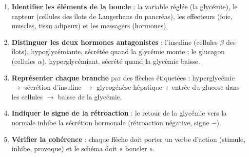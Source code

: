 \documentclass[11pt]{article}
\newcommand{\cle}[1]{{\popxbold\color{popdark}#1}}
\begin{document}
\begin{methode}
\begin{enumerate}
\item \textbf{Identifier les éléments de la boucle} : la variable réglée (la glycémie), le capteur (cellules des îlots de Langerhans du pancréas), les effecteurs (foie, muscles, tissu adipeux) et les messagers (hormones).
\item \textbf{Distinguer les deux hormones antagonistes} : l'\cle{insuline} (cellules $\beta$ des îlots), hypoglycémiante, sécrétée quand la glycémie monte ; le \cle{glucagon} (cellules $\alpha$), hyperglycémiant, sécrété quand la glycémie baisse.
\item \textbf{Représenter chaque branche} par des flèches étiquetées : hyperglycémie $\rightarrow$ sécrétion d'insuline $\rightarrow$ glycogénèse hépatique + entrée du glucose dans les cellules $\rightarrow$ baisse de la glycémie.
\item \textbf{Indiquer le signe de la rétroaction} : le retour de la glycémie vers la normale inhibe la sécrétion hormonale (rétroaction négative, signe $-$).
\item \textbf{Vérifier la cohérence} : chaque flèche doit porter un verbe d'action (stimule, inhibe, provoque) et le schéma doit « boucler ».
\end{enumerate}
\end{methode}
\end{document}
